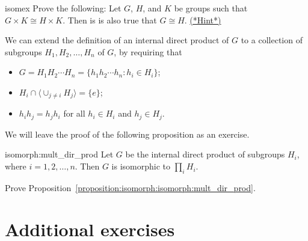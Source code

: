 \begin{exercise}{isomex}
Prove the following: Let $G$, $H$, and $K$ be
groups such that $G \times K \cong H \times K$. Then is is also true that $G \cong H$. 
\hyperref[sec:isomorph:hints]{(*Hint*)}
\end{exercise}

We can extend the definition of an internal direct product of $G$ to a
collection of subgroups $H_1, H_2, \ldots, H_n$ of $G$, by requiring
that 
\begin{itemize}
 
\item
$G = H_1 H_2 \cdots H_n = \{ h_1 h_2 \cdots h_n : h_i \in H_i \}$;
 
\item
$H_i \cap \langle \cup_{j \neq i} H_j \rangle = \{ e \}$;
 
\item
$h_i h_j = h_j h_i$ for all $h_i \in H_i$ and $h_j \in H_j$.
 
\end{itemize}
We will leave the proof of the following proposition as an exercise. 
 
\begin{prop}{isomorph:mult_dir_prod}
Let $G$ be the internal direct product of subgroups $H_i$, where $i =
1, 2, \ldots, n$. Then $G$ is isomorphic to $\prod_i H_i$. 
\end{prop}

\begin{exercise}{}
Prove Proposition~\ref{proposition:isomorph:isomorph:mult_dir_prod}.
\end{exercise}
 


 
\section*{Additional exercises}
\label{sec:Isomorphism:AdditionalExercises}
\exrule

 
 
